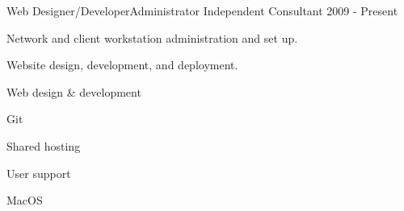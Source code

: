 \begin{cventries}
  \cventry
    {Web Designer/Developer{\enskip\cdotp\enskip}Administrator} %
    {Independent Consultant} %
    {} %
    {2009 - Present} %
    {%
      \begin{cvitems} %
        \item {Network and client workstation administration and set up.}
        \item {Website design, development, and deployment.}
      \end{cvitems}
    }
    \begin{cventryskills}
      \item Web design \& development
      \item Git
      \item Shared hosting
      \item User support
      \item MacOS
    \end{cventryskills}

\end{cventries}
